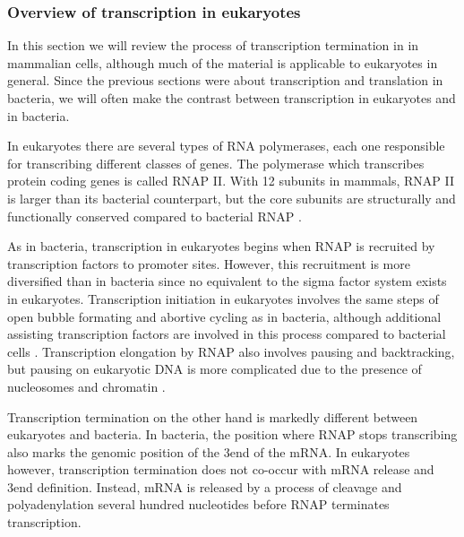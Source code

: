 %
\subsubsection{Overview of transcription in eukaryotes}
In this section we will review the process of transcription termination in in
mammalian cells, although much of the material is applicable to eukaryotes in
general. Since the previous sections were about transcription and translation
in bacteria, we will often make the contrast between transcription in
eukaryotes and in bacteria.

In eukaryotes there are several types of RNA polymerases, each one responsible
for transcribing different classes of genes. The polymerase which transcribes
protein coding genes is called RNAP II. With 12 subunits in mammals, RNAP II is
larger than its bacterial counterpart, but the core subunits are structurally
and functionally conserved compared to bacterial RNAP \cite{ebright_rna_2000}.

As in bacteria, transcription in eukaryotes begins when RNAP is recruited by
transcription factors to promoter sites. However, this recruitment is more
diversified than in bacteria since no equivalent to the sigma factor system
exists in eukaryotes. Transcription initiation in eukaryotes involves the same
steps of open bubble formating and abortive cycling as in bacteria, although
additional assisting transcription factors are involved in this process
compared to bacterial cells \cite{wade_transition_2008}. Transcription
elongation by RNAP also involves pausing and backtracking, but pausing on
eukaryotic DNA is more complicated due to the presence of nucleosomes and
chromatin \cite{sims_elongation_2004}.

Transcription termination on the other hand is markedly different between
eukaryotes and bacteria. In bacteria, the position where RNAP stops
transcribing also marks the genomic position of the 3\p end of the mRNA. In
eukaryotes however, transcription termination does not co-occur with mRNA
release and 3\p end definition. Instead, mRNA is released by a process of
cleavage and polyadenylation several hundred nucleotides before RNAP terminates
transcription.

